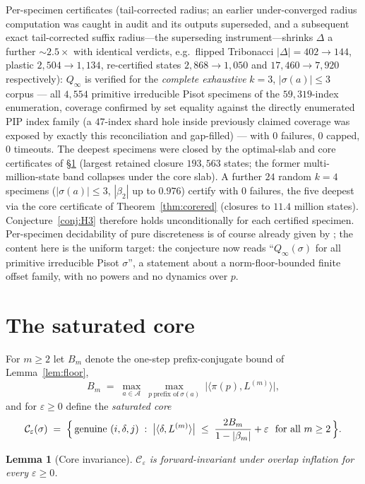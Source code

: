 \documentclass[11pt]{article}
\newtheorem{lemma}[theorem]{Lemma}
\begin{document}
Per-specimen certificates (tail-corrected radius; an earlier
under-converged radius computation was caught in audit and its outputs
superseded, and a subsequent exact tail-corrected suffix radius---the
superseding instrument---shrinks $\Delta$ a further $\sim2.5\times$ with
identical verdicts, e.g.\ flipped Tribonacci $|\Delta|=402\to144$,
plastic $2{,}504\to1{,}134$, re-certified states $2{,}868\to1{,}050$ and
$17{,}460\to7{,}920$ respectively): $Q_\infty$ is verified for the
\emph{complete exhaustive} $k=3$, $|\sigma(a)|\le3$ corpus --- all
$4{,}554$ primitive irreducible Pisot specimens of the $59{,}319$-index
enumeration, coverage confirmed by set equality against the directly
enumerated PIP index family (a $47$-index shard hole inside previously
claimed coverage was exposed by exactly this reconciliation and
gap-filled) --- with $0$ failures, $0$ capped, $0$ timeouts. The deepest
specimens were closed by the optimal-slab and core certificates of
\S\ref{sec:core} (largest retained closure $193{,}563$ states; the
former multi-million-state band collapses under the core slab). A
further $24$ random $k=4$ specimens
($|\sigma(a)|\le3$, $|\beta_2|$ up to $0.976$) certify with $0$
failures, the five deepest via the core certificate of
Theorem~\ref{thm:corered} (closures to $11.4$ million states).
Conjecture~\ref{conj:H3} therefore holds unconditionally for each
certified specimen. Per-specimen decidability of pure
discreteness is of course already given by \cite{AL11}; the content
here is the uniform target: the conjecture now reads ``$Q_\infty(\sigma)$
for all primitive irreducible Pisot $\sigma$'', a statement about a
norm-floor-bounded finite offset family, with no powers and no
dynamics over $p$.

\section{The saturated core}\label{sec:core}

For $m\ge2$ let $B_m$ denote the one-step prefix-conjugate bound of
Lemma~\ref{lem:floor},
\[
B_m \;=\; \max_{a\in\mathcal{A}}\ \max_{p\ \text{prefix of}\
\sigma(a)}\ \bigl|\langle\pi(p),L^{(m)}\rangle\bigr|,
\]
and for $\varepsilon\ge0$ define the \emph{saturated core}
\[
\mathcal{C}_\varepsilon(\sigma)\;=\;\Bigl\{\,\text{genuine }(i,\delta,j)
\;:\;\bigl|\langle\delta,L^{(m)}\rangle\bigr|\;\le\;
\frac{2B_m}{1-|\beta_m|}+\varepsilon\ \ \text{for all }m\ge2\,\Bigr\}.
\]

\begin{lemma}[Core invariance]\label{lem:coreinv}
$\mathcal{C}_\varepsilon$ is forward-invariant under overlap inflation
for every $\varepsilon\ge0$.
\end{lemma}
\end{document}
